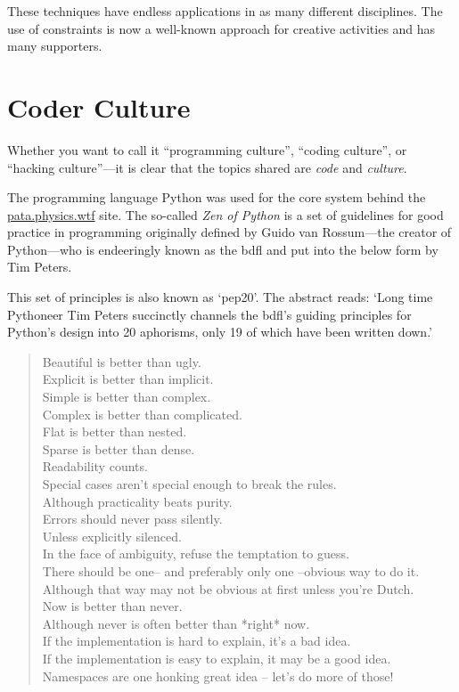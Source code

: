 These techniques have endless applications in as many different disciplines. The use of constraints is now a well-known approach for creative activities and has many supporters.


\section{Coder Culture}
\label{s:culture}

Whether you want to call it ``programming culture'', ``coding culture'', or ``hacking culture''---it is clear that the topics shared are \emph{code} and \emph{culture}.

The programming language Python was used for the core system behind the \url{pata.physics.wtf} site. The so-called \emph{Zen of Python} is a set of guidelines for good practice in programming originally defined by Guido van Rossum---the creator of Python---who is endeeringly known as the \gls{bdfl} and put into the below form by Tim Peters.

This set of principles is also known as `\acrshort{pep}20'. The abstract reads: `Long time Pythoneer Tim Peters succinctly channels the \acrshort{bdfl}\rq s guiding principles for Python\rq s design into 20 aphorisms, only 19 of which have been written down.' \citeyear{PEP20}

\begin{quotation}
  Beautiful is better than ugly.\\
  Explicit is better than implicit.\\
  Simple is better than complex.\\
  Complex is better than complicated.\\
  Flat is better than nested.\\
  Sparse is better than dense.\\
  Readability counts.\\
  Special cases aren't special enough to break the rules.\\
  Although practicality beats purity.\\
  Errors should never pass silently.\\
  Unless explicitly silenced.\\
  In the face of ambiguity, refuse the temptation to guess.\\
  There should be one-- and preferably only one --obvious way to do it.\\
  Although that way may not be obvious at first unless you're Dutch.\\
  Now is better than never.\\
  Although never is often better than *right* now.\\
  If the implementation is hard to explain, it's a bad idea.\\
  If the implementation is easy to explain, it may be a good idea.\\
  Namespaces are one honking great idea -- let's do more of those!
\end{quotation}

